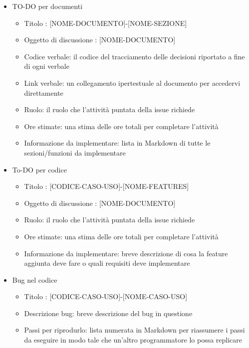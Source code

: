         \begin{itemize}
            \item  TO-DO per documenti
            \begin{itemize}
                \item Titolo : [NOME-DOCUMENTO]-[NOME-SEZIONE]
                \item Oggetto di discussione : [NOME-DOCUMENTO]
                \item Codice verbale: il codice del tracciamento delle decisioni riportato a fine di ogni verbale
                \item Link verbale: un collegamento ipertestuale al documento per accedervi direttamente
                \item Ruolo: il ruolo che l'attività puntata della issue richiede
                \item Ore stimate: una stima delle ore totali per completare l'attività
                \item Informazione da implementare: lista in Markdown di tutte le sezioni/funzioni da implementare
            \end{itemize}
            \item  To-DO per codice
            \begin{itemize}
                \item Titolo : [CODICE-CASO-USO]-[NOME-FEATURES]
                \item Oggetto di discussione : [NOME-DOCUMENTO]
                \item Ruolo: il ruolo che l'attività puntata della issue richiede
                \item Ore stimate: una stima delle ore totali per completare l'attività
                \item Informazione da implementare: breve descrizione di cosa la feature aggiunta deve fare o quali requisiti deve implementare
            \end{itemize}
            \item  Bug nel codice
            \begin{itemize}
                \item Titolo : [CODICE-CASO-USO]-[NOME-CASO-USO]
                \item Descrizione bug: breve descrizione del bug in questione
                \item Passi per riprodurlo: lista numerata in Markdown per riassumere i passi da eseguire in modo tale che un'altro programmatore lo possa replicare

\end{itemize}
\end{itemize}
